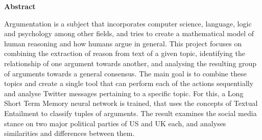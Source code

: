 \mbox{}\newline\vspace{10mm} \mbox{}\LARGE
{\bf Abstract} \normalsize \vspace{5mm}

    Argumentation is a subject that incorporates computer science, language, logic and psychology among other fields, and tries to create a mathematical model of human reasoning and how humans argue in general. This project focuses on combining the extraction of reason from text of a given topic, identifying the relationship of one argument towards another, and analysing the resulting group of arguments towards a general consensus. The main goal is to combine these topics and create a single tool that can perform each of the actions sequentially and analyse Twitter messages pertaining to a specific topic. For this, a Long Short Term Memory neural network is trained, that uses the concepts of Textual Entailment to classify tuples of arguments. The result examines the social media stance on two major political parties of US and UK each, and analyses similarities and differences between them.